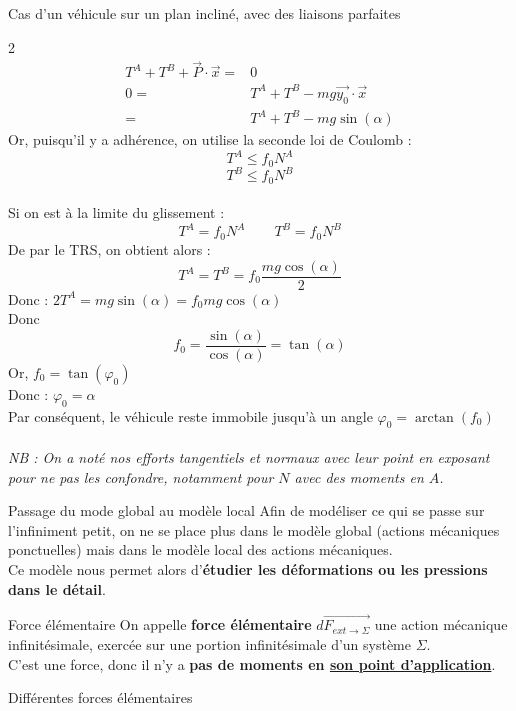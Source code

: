 \documentclass{article} %
\begin{document}
{\begin{exemple}{Cas d'un véhicule sur un plan incliné, avec des liaisons parfaites}
\begin{multicols}{2}
\begin{align*}
T^A+T^B+\overrightarrow{P}\cdot\overrightarrow{x}=&0\\
0=&T^A+T^B-mg\overrightarrow{y_0}\cdot\overrightarrow{x}\\
=&T^A+T^B-mg\sin(\alpha)
\end{align*}
Or, puisqu'il y a adhérence, on utilise la seconde loi de Coulomb :
$$T^A\leq f_0 N^A$$
$$T^B\leq f_0 N^B$$
\columnbreak\\
Si on est à la limite du glissement :
$$T^A= f_0 N^A \hspace{25pt} T^B= f_0 N^B$$
De par le TRS, on obtient alors :
$$T^A=T^B=f_0\frac{mg\cos(\alpha)}{2}$$
$\text{Donc : }2T^A=mg\sin(\alpha)=f_0mg \cos(\alpha)$\\
Donc $$f_0=\frac{\sin(\alpha)}{\cos(\alpha)}=\tan(\alpha)$$
Or, $f_0=\tan(\varphi_0)$\\
Donc : $\varphi_0=\alpha$\\
Par conséquent, le véhicule reste immobile jusqu'à un angle $\varphi_0=\arctan(f_0)$\\\\
{\small \textcolor{black!30}{\textit{NB : On a noté nos efforts tangentiels et normaux avec leur point en exposant pour ne pas les confondre, notamment pour $N$ avec des moments en $A$.}}}
\end{multicols}
\end{exemple}
{}
\begin{definition}{Passage du mode global au modèle local}
Afin de modéliser ce qui se passe sur l'infiniment petit, on ne se place plus dans le modèle global (actions mécaniques ponctuelles) mais dans le modèle local des actions mécaniques.\\
Ce modèle nous permet alors d'\textbf{étudier les déformations ou les pressions dans le détail}.
\end{definition}
\begin{definition}{Force élémentaire}
On appelle \textbf{force élémentaire} $d\overrightarrow{F_{ext\to\Sigma}}$ une action mécanique infinitésimale, exercée sur une portion infinitésimale d'un système $\Sigma$.\\
C'est une force, donc il n'y a \textbf{pas de moments en \underline{son point d'application}}.
\end{definition}
\begin{exemple}{Différentes forces élémentaires}\vspace*{-10pt}

\end{exemple}}
\end{document}
